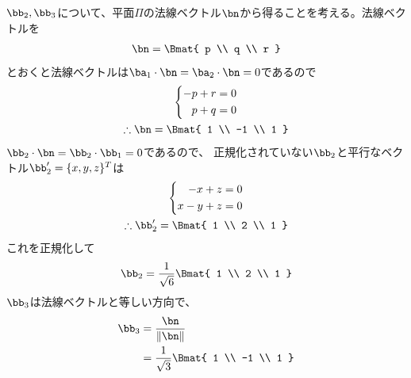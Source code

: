 \begin{other*}
  $\bb_2,\bb_3$について、平面$\Pi$の法線ベクトル$\bn$から得ることを考える。法線ベクトルを
  \begin{gather}
    \bn =
    \Bmat{
      p \\ q \\ r
    }
  \end{gather}
  とおくと法線ベクトルは$\ba_1\cdot\bn=\ba_2\cdot\bn=0$であるので
  \begin{gather}
    \left\{
    \begin{aligned}
      -p + r &= 0 \\
      p + q &= 0
    \end{aligned}
    \right.
    \\
    \therefore \bn =
    \Bmat{
      1 \\ -1 \\ 1
    }
  \end{gather}
  $\bb_2\cdot\bn=\bb_2\cdot\bb_1=0$であるので、
  正規化されていない$\bb_2$と平行なベクトル$\bb'_2 = \{x, y, z\}^T$は
  \begin{gather}
    \left\{
    \begin{aligned}
      -x + z &= 0 \\
      x - y + z &= 0
    \end{aligned}
    \right.
    \\
    \therefore \bb'_2 =
    \Bmat{
      1 \\ 2 \\ 1
    }
  \end{gather}
  これを正規化して
  \begin{gather}
    \bb_2 =
    \frac{1}{\sqrt{6}}
    \Bmat{
      1 \\ 2 \\ 1
    }
  \end{gather}
  $\bb_3$は法線ベクトルと等しい方向で、
  \begin{align}
    \bb_3
    &= \frac{\bn}{\|\bn\|} \\
    &= \frac{1}{\sqrt{3}}
    \Bmat{
      1 \\ -1 \\ 1
    }
  \end{align}
\end{other*}
